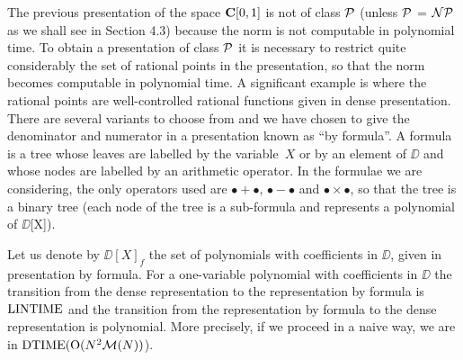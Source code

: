 The previous presentation of the space ${{\bf C}[0,1]}$ is not of class ${\cal P}$ (unless ${\cal P}$ = ${\cal NP}$ as we shall see in Section 4.3) because the norm is not computable in polynomial time. To obtain a presentation of class ${\cal P}$ it is necessary to restrict quite considerably the set of rational points in the presentation, so that the norm becomes computable in polynomial time. A significant example is where the rational points are well-controlled rational functions given in dense presentation.
There are several variants to choose from and we have chosen to give the denominator and numerator in a presentation known as ``by formula''. 
A formula is a tree whose leaves are labelled by the variable~$X$ or by an element of $\DD$ and whose nodes are labelled by an arithmetic operator. 
In the formulae we are considering, the only operators used are $ \bullet + \bullet $, $\bullet - \bullet $ and $\bullet \times \bullet$, so that the tree is a binary tree (each node of the tree is a sub-formula and represents a polynomial of $\DD$[X]). 



\begin{lemma} 
\label{324} Let us denote by $\DD[X]_f$ the set of polynomials with coefficients in $\DD$, given in presentation by formula. For a one-variable polynomial with coefficients in $\DD$ the transition from the dense representation to the representation by formula is ${\rm LINTIME}$ and the transition from the representation by formula to the dense representation is polynomial. More precisely, if we proceed in a naive way, we are in ${\rm DTIME} ({\rm O}(N^2{\cal M}(N))$).
\end{lemma}

